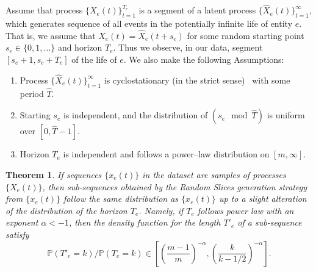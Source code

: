 \documentclass{article}
\newtheorem{thm}{Theorem}
\renewcommand{\P}{\mathbb{P}}
\begin{document}
Assume that process $\{X_e(t)\}_{t=1}^{T_e}$ is a segment of a latent process $\{\widehat{X}_e(t)\}_{t=1}^{\infty}$, which generates sequence of all events in the potentially infinite life of entity $e$. That is, we assume that $X_e(t)=\widehat{X}_e(t+s_e)$ for some random starting point $s_e\in \{0,1,\ldots\}$ and horizon $T_e$. Thus we observe, in our data, segment $[s_e+1,s_e+T_e]$ of the life of $e$. We also make the following Assumptions:
\begin{enumerate}
    \item Process $\{\widehat{X}_e(t)\}_{t=1}^{\infty}$ is cyclostationary (in the strict sense)~\cite{Gardner2006Cyclostationarity} with some period $\widehat{T}$.
    \item Starting $s_e$ is independent, and the distribution of $(s_e \mod \widehat{T})$ is uniform over $[0,\widehat{T}-1]$.
    \item Horizon $T_e$ is independent and follows a power--law distribution on $[m,\infty]$.
\end{enumerate}
\begin{thm}\label{thm:distribution}
If sequences $\{x_e(t)\}$ in the dataset are samples of processes $\{X_e(t)\}$, then sub-sequences obtained by the Random Slices generation strategy from $\{x_e(t)\}$ follow the same distribution as $\{x_e(t)\}$ up to a slight alteration of the distribution of the horizon $T_e$. Namely, if $T_e$ follows power law with an exponent $\alpha <-1$, then the density function for the length $T'_e$ of a sub-sequence satisfy 
\begin{equation}\label{probability_ratio}
\P(T'_e=k)/\P(T_e=k)\in \left [\left (\frac{m-1}{m}\right )^{-\alpha},\left (\frac{k}{k-1/2}\right )^{-\alpha}\right ].    
\end{equation}

\end{thm}
\end{document}
